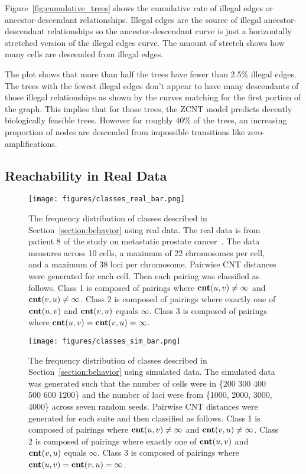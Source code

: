 Figure~\ref{fig:cumulative_trees} shows the cumulative rate of illegal edges or ancestor-descendant relationships. Illegal edges are the source of illegal ancestor-descendant relationships so the ancestor-descendant curve is just a horizontally stretched version of the illegal edges curve. The amount of stretch shows how many cells are descended from illegal edges. 

The plot shows that more than half the trees have fewer than 2.5\% illegal edges. The trees with the fewest illegal edges don't appear to have many descendants of those illegal relationships as shown by the curves matching for the first portion of the graph. This implies that for those trees, the ZCNT model predicts decently biologically feasible trees. However for roughly 40\% of the trees, an increasing proportion of nodes are descended from impossible transitions like zero-amplifications. 

\subsection{Reachability in Real Data}\label{section:real_reachability_res}

\begin{figure}[ht]
    \centering 
    \texttt{[image: figures/classes\_real\_bar.png]}
    \caption{The frequency distribution of classes described in Section~\ref{section:behavior} using real data. The real data is from patient 8 of the study on metastatic prostate cancer~\cite{real_data}. The data measures across 10 cells, a maximum of 22 chromosomes per cell, and a maximum of 38 loci per chromosome. Pairwise CNT distances were generated for each cell. Then each pairing was classified as follows. Class 1 is composed of pairings where $\textbf{cnt}(u, v) \neq \infty$ and $\textbf{cnt}(v, u) \neq \infty$. Class 2 is composed of pairings where exactly one of $\textbf{cnt}(u, v)$ and $\textbf{cnt}(v, u)$ equals $\infty$. Class 3 is composed of pairings where $\textbf{cnt}(u, v) = \textbf{cnt}(v, u) = \infty$.}\label{fig:classes_real_bar}
\end{figure}

\begin{figure}[ht]
    \centering 
    \texttt{[image: figures/classes\_sim\_bar.png]}
    \caption{The frequency distribution of classes described in Section~\ref{section:behavior} using simulated data. The simulated data was generated such that the number of cells were in \{200 300 400 500 600 1200\} and the number of loci were from \{1000, 2000, 3000, 4000\} across seven random seeds. Pairwise CNT distances were generated for each suite and then classified as follows. Class 1 is composed of pairings where $\textbf{cnt}(u, v) \neq \infty$ and $\textbf{cnt}(v, u) \neq \infty$. Class 2 is composed of pairings where exactly one of $\textbf{cnt}(u, v)$ and $\textbf{cnt}(v, u)$ equals $\infty$. Class 3 is composed of pairings where $\textbf{cnt}(u, v) = \textbf{cnt}(v, u) = \infty$.}\label{fig:classes_sim_bar}
\end{figure}

